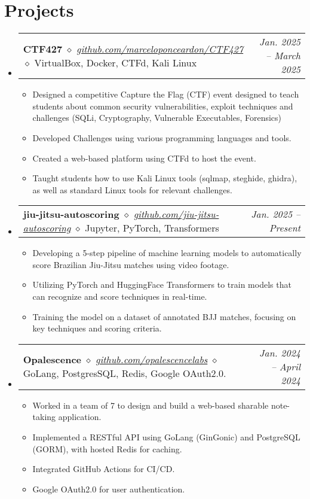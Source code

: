 \documentclass[letterpaper,11pt]{article}
\makeatletter
\newcommand{\resumeItem}[1]{
  \item\small{
    {#1 \vspace{-2pt}}
  }
}
\newcommand{\resumeProjectHeading}[2]{
    \item
    \begin{tabular*}{0.97\textwidth}{l@{\extracolsep{\fill}}r}
      \small#1 & #2 \\
    \end{tabular*}\vspace{-7pt}
}
\newcommand{\resumeSubHeadingListStart}{\begin{itemize}[leftmargin=0.15in, label={}]}
\newcommand{\resumeSubHeadingListEnd}{\end{itemize}}
\newcommand{\resumeItemListStart}{\begin{itemize}}
\newcommand{\resumeItemListEnd}{\end{itemize}\vspace{-5pt}}
\makeatother
\begin{document}
\section{Projects}
    \resumeSubHeadingListStart
      \resumeProjectHeading
      {\textbf{CTF427} $\diamond$ \textit{\href{https://github.com/marceloponceardon/CTF427}{github.com/marceloponceardon/CTF427}} $\diamond$ {\footnotesize VirtualBox, Docker, CTFd, Kali Linux}}{\emph{Jan. 2025 -- March 2025}}
          \resumeItemListStart
	  \resumeItem{Designed a competitive Capture the Flag (CTF) event designed to teach students about common security vulnerabilities, exploit techniques and challenges (SQLi, Cryptography, Vulnerable Executables, Forensics)}
	  \resumeItem{Developed Challenges using various programming languages and tools.}
	  \resumeItem{Created a web-based platform using CTFd to host the event.}
	  \resumeItem{Taught students how to use Kali Linux tools (sqlmap, steghide, ghidra), as well as standard Linux tools for relevant challenges.}
          \resumeItemListEnd
      \resumeProjectHeading
      {\textbf{jiu-jitsu-autoscoring} $\diamond$ \textit{\href{https://github.com/jiu-jitsu-autoscoring}{github.com/jiu-jitsu-autoscoring}} $\diamond$ {\footnotesize Jupyter, PyTorch, Transformers}}{\emph{Jan. 2025 -- Present}}
          \resumeItemListStart
	  \resumeItem{Developing a 5-step pipeline of machine learning models to automatically score Brazilian Jiu-Jitsu matches using video footage.}
	  \resumeItem{Utilizing PyTorch and HuggingFace Transformers to train models that can recognize and score techniques in real-time.}
	  \resumeItem{Training the model on a dataset of annotated BJJ matches, focusing on key techniques and scoring criteria.}
          \resumeItemListEnd
      \resumeProjectHeading
      {\textbf{Opalescence} $\diamond$ \textit{\href{https://github.com/opalescencelabs}{github.com/opalescencelabs}} $\diamond$ {\footnotesize GoLang, PostgresSQL, Redis, Google OAuth2.0.}}{\emph{Jan. 2024 -- April 2024}}
          \resumeItemListStart
	  \resumeItem{Worked in a team of 7 to design and build a web-based sharable note-taking application.}
	  \resumeItem{Implemented a RESTful API using GoLang (GinGonic) and PostgreSQL (GORM), with hosted Redis for caching.}
	  \resumeItem{Integrated GitHub Actions for CI/CD.}
	  \resumeItem{Google OAuth2.0 for user authentication.}
          \resumeItemListEnd
    \resumeSubHeadingListEnd
\end{document}
